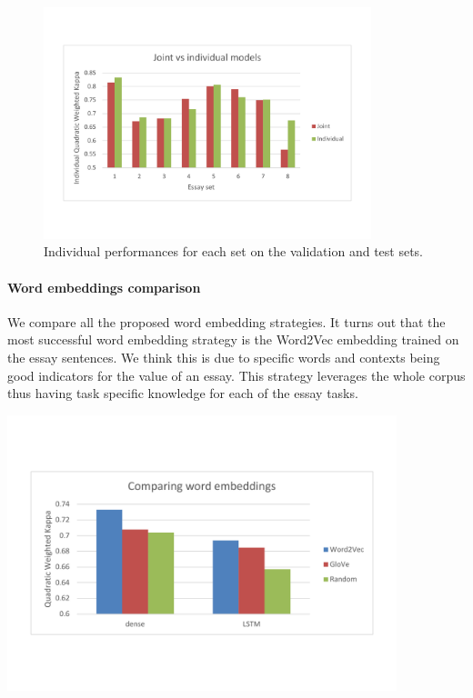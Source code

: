 \documentclass[a4paper,12pt,english]{article}
\begin{document}
\begin{figure}
\centering
\includegraphics[width=0.85\textwidth]{fig/joint_vs_indiv.pdf}
\caption{Individual performances for each set on the validation and test sets.}
\label{fig:individualperf}
\end{figure}

\paragraph{Word embeddings comparison} We compare all the proposed word embedding strategies. It turns out that the most successful word embedding strategy is the Word2Vec embedding trained on the essay sentences. We think this is due to specific words and contexts being good indicators for the value of an essay. This strategy leverages the whole corpus thus having task specific knowledge for each of the essay tasks.

\begin{center}
\vspace*{-1.5cm}
\includegraphics[width=0.85\textwidth]{fig/word_embeddings.pdf}
\vspace*{-1.5cm}
\end{center}
\end{document}
